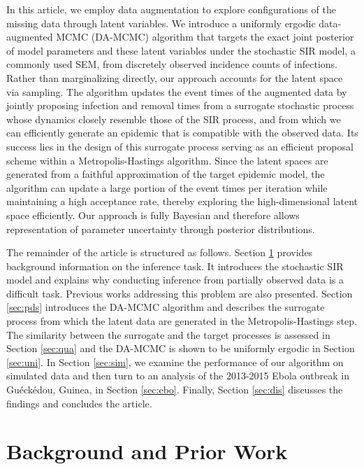 \documentclass[12pt]{article}
\begin{document}
In this article, we employ data augmentation to explore configurations of the missing data through latent variables. We introduce a uniformly ergodic data-augmented MCMC (DA-MCMC) algorithm that targets the exact joint posterior of model parameters and these latent variables under the stochastic SIR model, a commonly used SEM, from discretely observed incidence counts of infections. Rather than marginalizing directly, our approach accounts for the latent space via sampling. The algorithm updates the event times of the augmented data by jointly proposing infection and removal times from a surrogate stochastic process whose dynamics closely resemble those of the SIR process, and from which we can efficiently generate an epidemic that is compatible with the observed data. Its success lies in the design of this surrogate process serving as an efficient proposal scheme within a Metropolis-Hastings algorithm. Since the latent spaces are generated from a faithful approximation of the target epidemic model, the algorithm can update a large portion of the event times per iteration while maintaining a high acceptance rate, thereby exploring the high-dimensional latent space efficiently. Our approach is fully Bayesian and therefore allows representation of parameter uncertainty through posterior distributions.

The remainder of the article is structured as follows. Section \ref{sec:set} provides background information on the inference task. It introduces the stochastic SIR model and explains why conducting inference from partially observed data is a difficult task. Previous works addressing this problem are also presented. Section \ref{sec:pds} introduces the DA-MCMC algorithm and describes the surrogate process from which the latent data are generated in the Metropolis-Hastings step. The similarity between the surrogate and the target processes is assessed in Section \ref{sec:qua} and the DA-MCMC is shown to be uniformly ergodic in Section \ref{sec:uni}. In Section \ref{sec:sim}, we examine the performance of our algorithm on simulated data and then turn to an analysis of the 2013-2015 Ebola outbreak in Gu\'eck\'edou, Guinea, in Section \ref{sec:ebo}. Finally, Section \ref{sec:dis} discusses the findings and concludes the article.

\section{Background and Prior Work}
\label{sec:set}
\end{document}
